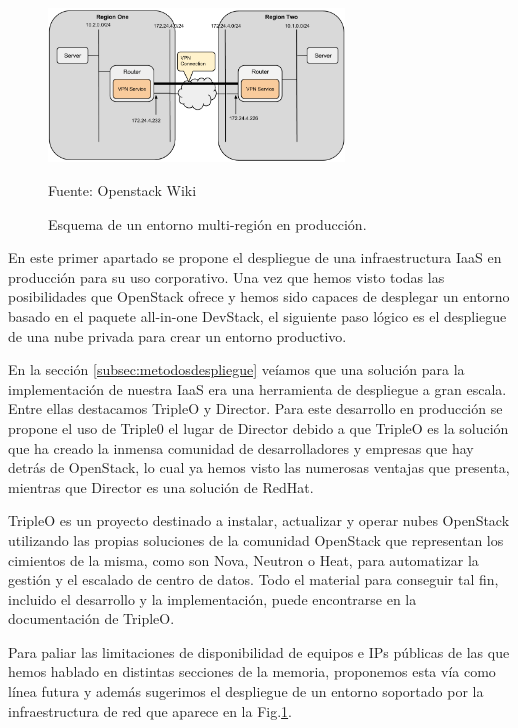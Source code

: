 \begin{figure}
    \centering
    \includegraphics[width=0.7\textwidth]{imagenes/capitulo9/Multi-case.png}
    \caption{Esquema de un entorno multi-región en producción.}
	\vspace{0.3cm}
    \footnotesize{Fuente: Openstack Wiki }
    \label{multi-case}
\end{figure}

En este primer apartado se propone el despliegue de una infraestructura IaaS en producción para su uso corporativo. Una vez que hemos visto todas las posibilidades que OpenStack ofrece y hemos sido capaces de desplegar un entorno basado en el paquete all-in-one DevStack, el siguiente paso lógico es el despliegue de una nube privada para crear un entorno productivo.

En la sección \ref{subsec:metodosdespliegue} veíamos que una solución para la implementación de nuestra IaaS era una herramienta de despliegue a gran escala. Entre ellas destacamos TripleO y Director. Para este desarrollo en producción se propone el uso de Triple0 el lugar de Director debido a que TripleO es la solución que ha creado la inmensa comunidad de desarrolladores y empresas que hay detrás de OpenStack, lo cual ya hemos visto las numerosas ventajas que presenta, mientras que Director es una solución de RedHat.

TripleO es un proyecto destinado a instalar, actualizar y operar nubes OpenStack utilizando las propias soluciones de la comunidad OpenStack que representan los cimientos de la misma, como son Nova, Neutron o Heat, para automatizar la gestión y el escalado de centro de datos. Todo el material para conseguir tal fin, incluido el desarrollo y la implementación, puede encontrarse en la documentación de TripleO.\cite{noauthor_tripleo_nodate-1}

Para paliar las limitaciones de disponibilidad de equipos e IPs públicas de las que hemos hablado en distintas secciones de la memoria, proponemos esta vía como línea futura y además sugerimos el despliegue de un entorno soportado por la infraestructura de red que aparece en la Fig.\ref{multi-case}.

